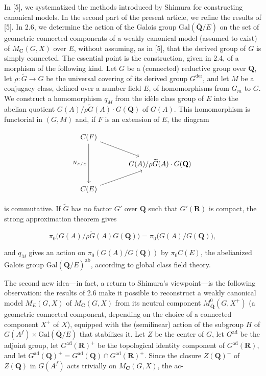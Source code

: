 \documentclass[10pt,a4paper]{article}
\begin{document}
In {[}5{]}, we systematized the methods introduced by Shimura for constructing canonical models. In the second part of the present article, we refine the results of {[}5{]}. In 2.6, we determine the action of the Galois group \(\mathrm{Gal}(\overline{\mathbf Q}/E)\) on the set of geometric connected components of a weakly canonical model (assumed to exist) of \(M_{\mathbf C}(G,X)\) over \(E\), without assuming, as in {[}5{]}, that the derived group of \(G\) is simply connected. The essential point is the construction, given in 2.4, of a morphism of the following kind. Let \(G\) be a (connected) reductive group over \(\mathbf Q\), let \(\rho:\widetilde G\to G\) be the universal covering of its derived group \(G^{\mathrm{der}}\), and let \(M\) be a conjugacy class, defined over a number field \(E\), of homomorphisms from \(G_m\) to \(G\). We construct a homomorphism \(q_M\) from the idèle class group of \(E\) into the abelian quotient \(G(A)/\rho\widetilde G(A)\cdot G(\mathbf Q)\) of \(G(A)\). This homomorphism is functorial in \((G,M)\) and, if \(F\) is an extension of \(E\), the diagram

\[
\begin{tikzcd}[column sep=large,row sep=normal]
C(F) \arrow[dd,"N_{F/E}"'] \arrow[dr] & \\
& G(A)/\rho\widetilde G(A)\cdot G(\mathbf Q) \\
C(E) \arrow[ur] &
\end{tikzcd}
\]

is commutative. If \(\widetilde G\) has no factor \(G'\) over \(\mathbf Q\) such that \(G'(\mathbf R)\) is compact, the strong approximation theorem gives

\[
\pi_0\bigl(G(A)/\rho\widetilde G(A)G(\mathbf Q)\bigr)
=
\pi_0\bigl(G(A)/G(\mathbf Q)\bigr),
\]

and \(q_M\) gives an action on \(\pi_0(G(A)/G(\mathbf Q))\) by \(\pi_0C(E)\), the abelianized Galois group \(\mathrm{Gal}(\overline{\mathbf Q}/E)^{\mathrm{ab}}\), according to global class field theory.

The second new idea---in fact, a return to Shimura's viewpoint---is the following observation: the results of 2.6 make it possible to reconstruct a weakly canonical model \(M_E(G,X)\) of \(M_{\mathbf C}(G,X)\) from its neutral component \(M^0_{\overline{\mathbf Q}}(G,X^+)\) (a geometric connected component, depending on the choice of a connected component \(X^+\) of \(X\)), equipped with the (semilinear) action of the subgroup \(H\) of \(G(A^f)\times\mathrm{Gal}(\overline{\mathbf Q}/E)\) that stabilizes it. Let \(Z\) be the center of \(G\), let \(G^{\mathrm{ad}}\) be the adjoint group, let \(G^{\mathrm{ad}}(\mathbf R)^+\) be the topological identity component of \(G^{\mathrm{ad}}(\mathbf R)\), and let \(G^{\mathrm{ad}}(\mathbf Q)^+=G^{\mathrm{ad}}(\mathbf Q)\cap G^{\mathrm{ad}}(\mathbf R)^+\). Since the closure \(Z(\mathbf Q)^-\) of \(Z(\mathbf Q)\) in \(G(A^f)\) acts trivially on \(M_{\mathbf C}(G,X)\), the ac-
\end{document}
